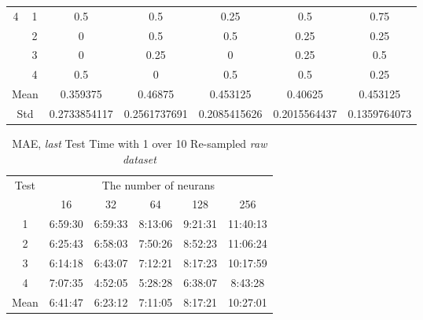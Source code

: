 \documentclass[draft,dvipsnames]{drexel-thesis}
\begin{document}
\begin{thesis}
\begin{table}[!t]
\begin{tabular}{|c|c|c|c|c|c|c|}
\multirow{4}{*}{4}    & 1                   & 0.5          & 0.5          & 0.25         & 0.5          & 0.75         \\ \cline{2-7}
                      & 2                   & 0            & 0.5          & 0.5          & 0.25         & 0.25         \\ \cline{2-7}
                      & 3                   & 0            & 0.25         & 0            & 0.25         & 0.5          \\ \cline{2-7}
                      & 4                   & 0.5          & 0            & 0.5          & 0.5          & 0.25         \\ \hline
\multicolumn{2}{|c|}{Mean}                  & 0.359375     & 0.46875      & 0.453125     & 0.40625      & 0.453125     \\ \hline
\multicolumn{2}{|c|}{Std}                   & 0.2733854117 & 0.2561737691 & 0.2085415626 & 0.2015564437 & 0.1359764073 \\ \hline
\end{tabular}
\end{table}

\begin{table}[!t]
\centering
\caption{MAE, {\em last} Test Time with 1 over 10 Re-sampled {\em raw dataset}}
\label{tbl:mae_last_1_10_time}
\begin{tabular}{|c|c|c|c|c|c|}
\hline
\multirow{2}{*}{Test} & \multicolumn{5}{c|}{The number of neurans}       \\ \cline{2-6}
                      & 16      & 32      & 64      & 128     & 256      \\ \hline
1                     & 6:59:30 & 6:59:33 & 8:13:06 & 9:21:31 & 11:40:13 \\ \hline
2                     & 6:25:43 & 6:58:03 & 7:50:26 & 8:52:23 & 11:06:24 \\ \hline
3                     & 6:14:18 & 6:43:07 & 7:12:21 & 8:17:23 & 10:17:59 \\ \hline
4                     & 7:07:35 & 4:52:05 & 5:28:28 & 6:38:07 & 8:43:28  \\ \hline
Mean                  & 6:41:47 & 6:23:12 & 7:11:05 & 8:17:21 & 10:27:01 \\ \hline
\end{tabular}
\end{table}


\end{thesis}
\end{document}
